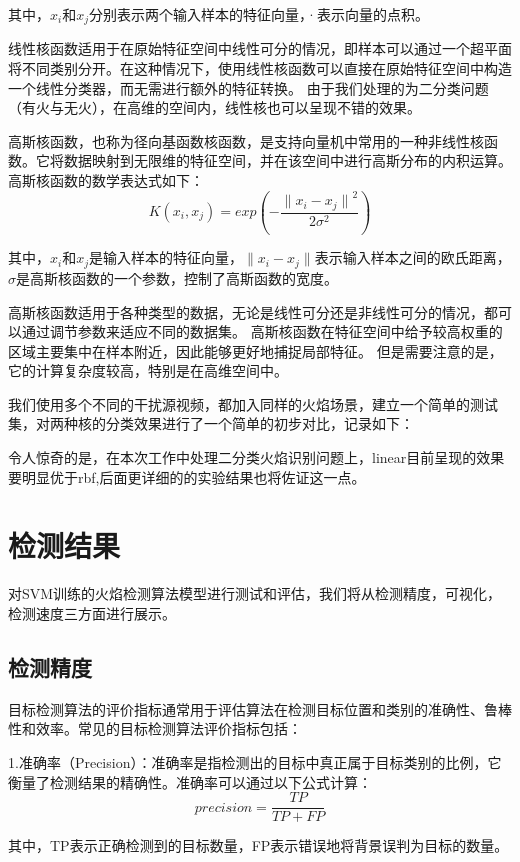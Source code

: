 其中，$x_i$和$x_j$分别表示两个输入样本的特征向量，·表示向量的点积。

线性核函数适用于在原始特征空间中线性可分的情况，即样本可以通过一个超平面将不同类别分开。在这种情况下，使用线性核函数可以直接在原始特征空间中构造一个线性分类器，而无需进行额外的特征转换。
由于我们处理的为二分类问题（有火与无火），在高维的空间内，线性核也可以呈现不错的效果。

高斯核函数，也称为径向基函数核函数，是支持向量机中常用的一种非线性核函数。它将数据映射到无限维的特征空间，并在该空间中进行高斯分布的内积运算。
高斯核函数的数学表达式如下：
\begin{equation} 
    K(x_i,x_j)=exp(-\frac{{\lVert x_i-x_j \rVert}^2}{2\sigma^2})
\end{equation}

其中，$x_i$和$x_j$是输入样本的特征向量，$\lVert x_i-x_j \rVert$表示输入样本之间的欧氏距离，$\sigma$是高斯核函数的一个参数，控制了高斯函数的宽度。

高斯核函数适用于各种类型的数据，无论是线性可分还是非线性可分的情况，都可以通过调节参数来适应不同的数据集。
高斯核函数在特征空间中给予较高权重的区域主要集中在样本附近，因此能够更好地捕捉局部特征。
但是需要注意的是，它的计算复杂度较高，特别是在高维空间中。

我们使用多个不同的干扰源视频，都加入同样的火焰场景，建立一个简单的测试集，对两种核的分类效果进行了一个简单的初步对比，记录如下：

令人惊奇的是，在本次工作中处理二分类火焰识别问题上，linear目前呈现的效果要明显优于rbf,后面更详细的的实验结果也将佐证这一点。
\section{检测结果}
对SVM训练的火焰检测算法模型进行测试和评估，我们将从检测精度，可视化，检测速度三方面进行展示。
\subsection{检测精度}
目标检测算法的评价指标通常用于评估算法在检测目标位置和类别的准确性、鲁棒性和效率。常见的目标检测算法评价指标包括：

1.准确率（Precision）：准确率是指检测出的目标中真正属于目标类别的比例，它衡量了检测结果的精确性。准确率可以通过以下公式计算：
\begin{equation} 
    precision=\frac{TP}{TP+FP}
\end{equation}

其中，TP表示正确检测到的目标数量，FP表示错误地将背景误判为目标的数量。

